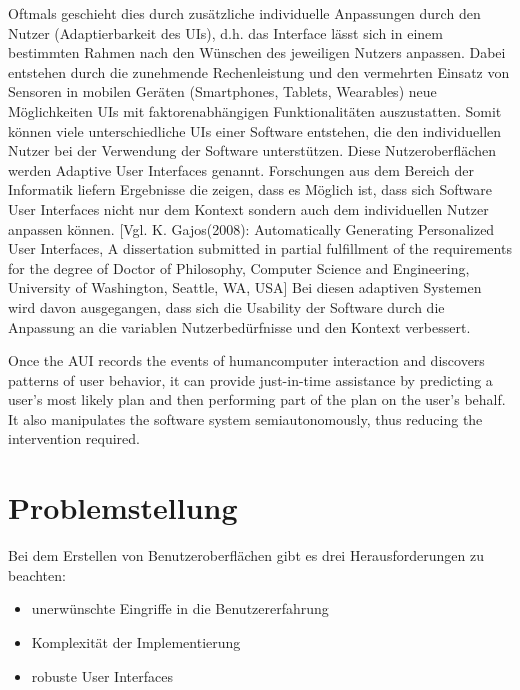 Oftmals geschieht dies durch zusätzliche individuelle Anpassungen durch den Nutzer (Adaptierbarkeit des UIs),
d.h. das Interface lässt sich in einem bestimmten Rahmen nach den Wünschen des jeweiligen Nutzers anpassen.
Dabei entstehen durch die zunehmende Rechenleistung und den vermehrten Einsatz von Sensoren in mobilen Geräten
(Smartphones, Tablets, Wearables) neue Möglichkeiten UIs mit faktorenabhängigen Funktionalitäten auszustatten.
Somit können viele unterschiedliche UIs einer Software entstehen, die den individuellen Nutzer bei der Verwendung der Software unterstützen.
Diese Nutzeroberflächen werden Adaptive User Interfaces genannt. Forschungen aus dem Bereich der Informatik liefern Ergebnisse die zeigen,
dass es Möglich ist, dass sich Software User Interfaces nicht nur dem Kontext sondern auch dem individuellen Nutzer anpassen können. [Vgl. K. Gajos(2008): Automatically Generating Personalized User Interfaces, A dissertation submitted in partial fulfillment of the requirements for the degree of Doctor of Philosophy, Computer Science and Engineering, University of Washington, Seattle, WA, USA]
Bei diesen adaptiven Systemen wird davon ausgegangen, dass sich die Usability der Software durch die Anpassung an die
variablen Nutzerbedürfnisse und den Kontext verbessert.

Once the AUI records the events of humancomputer interaction and discovers patterns of user behavior, it can provide just-in-time assistance by
predicting a user’s most likely plan and then performing part of the plan on the user’s behalf. It also manipulates the software system semiautonomously,
thus reducing the intervention required.

\section{Problemstellung}
Bei dem Erstellen von Benutzeroberflächen gibt es drei Herausforderungen zu beachten:
\begin{itemize}
    \item unerwünschte Eingriffe in die Benutzererfahrung
    \item Komplexität der Implementierung
    \item robuste User Interfaces
\end{itemize}

